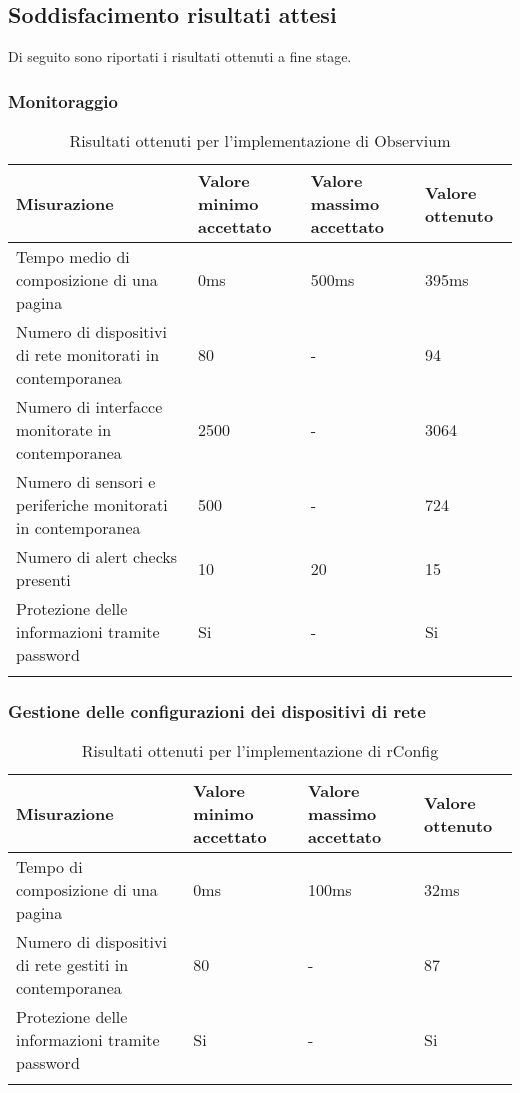 \documentclass[Tesi.tex]{subfiles}
\begin{document}
\subsection{Soddisfacimento risultati attesi}
Di seguito sono riportati i risultati ottenuti a fine stage.

\subsubsection{Monitoraggio}
\label{table:Risultati ottenuti per l'implementazione di Observium}
\renewcommand*{\arraystretch}{1.2}
\begin{longtable}[H]{p{8cm}p{2cm}p{2cm}p{2cm}}
	\rowcolor{CHeader}
	\color{CHeaderText} \textbf{Misurazione} & \color{CHeaderText} \textbf{Valore minimo accettato} & \color{CHeaderText} \textbf{Valore massimo accettato}  & \color{CHeaderText} \textbf{Valore ottenuto} \\
	\endhead
	Tempo medio di composizione di una pagina
	& 0ms & 500ms & 395ms \\
	Numero di dispositivi di rete monitorati in contemporanea
	& 80 & - & 94\\
	Numero di interfacce monitorate in contemporanea
	& 2500 & - & 3064\\
	Numero di sensori e periferiche monitorati in contemporanea
	& 500 & - & 724\\
	Numero di alert checks presenti
	& 10 & 20 & 15\\
	Protezione delle informazioni tramite password
	& Si & - & Si\\
	\hiderowcolors
	\caption{Risultati ottenuti per l'implementazione di Observium}
\end{longtable}

\subsubsection{Gestione delle configurazioni dei dispositivi di rete}
\label{table:Risultati ottenuti per l'implementazione di rConfig}
\renewcommand*{\arraystretch}{1.2}
\begin{longtable}[H]{p{8cm}p{2cm}p{2cm}p{2cm}}
	\rowcolor{CHeader}
	\color{CHeaderText} \textbf{Misurazione} & \color{CHeaderText} \textbf{Valore minimo accettato} & \color{CHeaderText} \textbf{Valore massimo accettato} & \color{CHeaderText} \textbf{Valore ottenuto} \\
	\endhead
	Tempo di composizione di una pagina
	& 0ms & 100ms & 32ms\\
	Numero di dispositivi di rete gestiti in contemporanea
	& 80 & - & 87 \\
	Protezione delle informazioni tramite password
	& Si & - & Si \\
	\hiderowcolors
	\caption{Risultati ottenuti per l'implementazione di rConfig}
\end{longtable}
\end{document}

